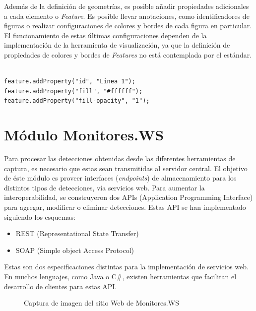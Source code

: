 Además de la definición de geometrías, es posible añadir propiedades adicionales a cada elemento o \textit{Feature}. Es posible llevar anotaciones, como identificadores de figuras o realizar configuraciones de colores y bordes de cada figura en particular. El funcionamiento de estas últimas configuraciones dependen de la implementación de la herramienta de visualización, ya que la definición de propiedades de colores y bordes de \textit{Features} no está contemplada por el estándar.

\begin{lstlisting}[caption={Código para configurar propiedades adicionales},captionpos=b,label={code:properties},frame=single]  % Start your code-block

feature.addProperty("id", "Linea 1");
feature.addProperty("fill", "#ffffff");
feature.addProperty("fill-opacity", "1");
\end{lstlisting}

\section{Módulo Monitores.WS}

Para procesar las detecciones obtenidas desde las diferentes herramientas de captura, es necesario que estas sean transmitidas al servidor central. El objetivo de éste módulo es proveer interfaces (\textit{endpoints}) de almacenamiento para los distintos tipos de detecciones, vía servicios web. Para aumentar la interoperabilidad, se construyeron dos APIs (Application Programming Interface) para agregar, modificar o eliminar detecciones. Estas API se han implementado siguiendo los esquemas:

\begin{itemize}
\item REST (Representational State Transfer)
\item SOAP (Simple object Access Protocol)
\end{itemize}

Estas son dos especificaciones distintas para la implementación de servicios web. En muchos lenguajes, como Java o C\#, existen herramientas que facilitan el desarrollo de clientes para estas API.

\begin{figure}[!htp]
	\centering
	\captionsetup{width=0.9\textwidth}
	\caption{Captura de imagen del sitio Web de Monitores.WS}
    \label{fig:monitoresws}
\end{figure}

